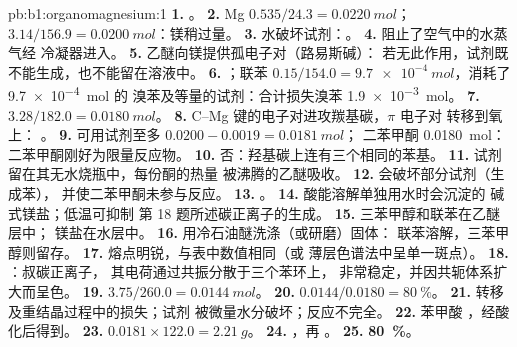 \begin{solution}{pb:b1:organomagnesium:1}
\textbf{1.} 。
\textbf{2.} Mg $0.535/24.3 = \qty{0.0220}{mol}$； $3.14/156.9 =
\qty{0.0200}{mol}$：镁稍过量。
\textbf{3.} 水破坏试剂：。
\textbf{4.} 阻止了空气中的水蒸气经
冷凝器进入。
\textbf{5.} 乙醚向镁提供孤电子对（路易斯碱）：
若无此作用，试剂既不能生成，也不能留在溶液中。
\textbf{6.} ；联苯
$0.15/154.0 = \qty{9.7e-4}{mol}$，消耗了 \qty{9.7e-4}{mol} 的
溴苯及等量的试剂：合计损失溴苯
\qty{1.9e-3}{mol}。
\textbf{7.} $3.28/182.0 = \qty{0.0180}{mol}$。
\textbf{8.} C--Mg 键的电子对进攻羰基碳，$\pi$ 电子对
转移到氧上： 。
\textbf{9.} 可用试剂至多 $0.0200 - 0.0019 = \qty{0.0181}{mol}$；
二苯甲酮 \qty{0.0180}{mol}：二苯甲酮刚好为限量反应物。
\textbf{10.} 否：羟基碳上连有三个相同的苯基。
\textbf{11.} 试剂留在其无水烧瓶中，每份酮的热量
被沸腾的乙醚吸收。
\textbf{12.} 会破坏部分试剂（生成苯），
并使二苯甲酮未参与反应。
\textbf{13.} 。
\textbf{14.} 酸能溶解单独用水时会沉淀的
碱式镁盐；低温可抑制
第 18 题所述碳正离子的生成。
\textbf{15.} 三苯甲醇和联苯在乙醚层中；
镁盐在水层中。
\textbf{16.} 用冷石油醚洗涤（或研磨）固体：
联苯溶解，三苯甲醇则留存。
\textbf{17.} 熔点明锐，与表中数值相同（或
薄层色谱法中呈单一斑点）。
\textbf{18.} ：叔碳正离子，
其电荷通过共振分散于三个苯环上，
非常稳定，并因共轭体系扩大而呈色。
\textbf{19.} $3.75/260.0 = \qty{0.0144}{mol}$。
\textbf{20.} $0.0144/0.0180 = \qty{80}{\percent}$。
\textbf{21.} 转移及重结晶过程中的损失；试剂
被微量水分破坏；反应不完全。
\textbf{22.} 苯甲酸 ，经酸化后得到。
\textbf{23.} $0.0181 \times 122.0 = \qty{2.21}{g}$。
\textbf{24.} ，再
。
\textbf{25.} \textbf{\qty{80}{\percent}}。
\end{solution}
